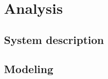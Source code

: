 
\part{Analysis}
\label{Analysis}

\chapter{System description}
\label{System_description}



\chapter{Modeling}
\label{modeling}













 
 